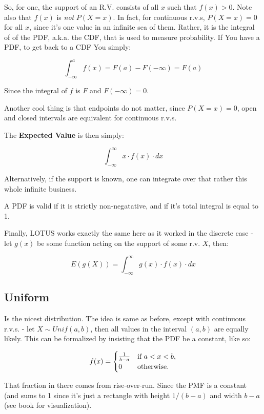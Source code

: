 \documentclass{article}
\begin{document}
		So, for one, the support of an R.V. consists of all $x$ such that $f(x)>0$. Note also that $f(x)$ is \textit{not} $P(X=x)$. In fact, for continuous r.v.s, $P(X=x) = 0$ for all $x$, since it's one value in an infinite sea of them. Rather, it is the integral of of the PDF, a.k.a. the CDF, that is used to measure probability. If You have a PDF, to get back to a CDF You simply:
		
		\[ \int^a_{-\infty} f(x) = F(a) - F(-\infty) = F(a) \]
		
		Since the integral of $f$ is $F$ and $F(-\infty) = 0$.
		
		Another cool thing is that endpoints do not matter, since $P(X=x)=0$, open and closed intervals are equivalent for continuous r.v.s.
		
		The \textbf{Expected Value} is then simply:
		
		\[ \int^\infty_{-\infty} x\cdot f(x) \cdot dx \]
		
		Alternatively, if the support is known, one can integrate over that rather this whole infinite business.
		
		A PDF is valid if it is strictly non-negatative, and if it's total integral is equal to 1.
		
		Finally, LOTUS works exactly the same here as it worked in the discrete case - let $g(x)$ be some function acting on the support of some r.v. $X$, then:
		
		\[ E(g(X)) = \int^\infty_{-\infty} g(x)\cdot f(x)\cdot dx \]
		
	\subsection{Uniform}
		
		Is the nicest distribution. The idea is same as before, except with continuous r.v.s. - let $X\sim Unif(a, b)$, then all values in the interval $(a, b)$ are equally likely. This can be formalized by insisting that the PDF be a constant, like so:
		
		\[ f(x) = 	\begin{cases}
						\frac{1}{b-a} & \textnormal{if } a < x < b, \\
						0 & \textnormal{otherwise.}
					\end{cases}
		\]		
		
		That fraction in there comes from rise-over-run. Since the PMF is a constant (and sums to 1 since it's just a rectangle with height $1/(b-a)$ and width $b-a$ (see book for visualization).
		
\end{document}
